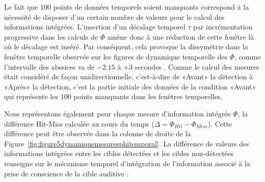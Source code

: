 Le fait que $100$ points de données temporels soient manquants correspond à la nécessité de disposer d'un certain nombre de valeurs pour le calcul des informations intégrées. 
L'insertion d'un décalage temporel $\tau$ par incrémentation progressive dans les calculs de $\Phi$ amène donc à une réduction de cette fenêtre là où le décalage est inséré. 
Par conséquent, cela provoque la dissymétrie dans la fenêtre temporelle observée sur les figures de dynamique temporelle des $\Phi$, comme l'intervalle des abssices va de $-2.15$ à $+3$ secondes . 
Comme le calcul des mesures était considéré de façon unidirectionnelle, c'est-à-dire de «Avant» la détection à «Après» la détection, c'est la partie initiale des données de la condition «Avant» qui représente les $100$ points manquants dans les fenêtres temporelles. 

Nous représentons également pour chaque mesure d'information intégrée $\Phi$, la différence Hit-Miss calculée au cours du temps ($\Delta = \Phi_{Hit} - \Phi_{Miss}$). 
Cette différence peut être observée dans la colonne de droite de la Figure~\ref{fig:figure5dynamiquemesuresphitemporal}. 
La différence de valeurs des informations intégrées entre les cibles détectées et les cibles non-détectées renseigne sur le mécanisme temporel d'intégration de l'information associé à la prise de conscience de la cible auditive : \\

